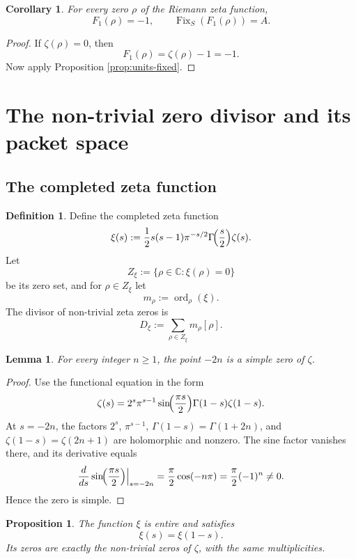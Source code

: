 \documentclass[11pt,a4paper]{article}
\newtheorem{proposition}[theorem]{Proposition}
\newtheorem{lemma}[theorem]{Lemma}
\newtheorem{corollary}[theorem]{Corollary}
\theoremstyle{definition}
\newtheorem{definition}[theorem]{Definition}
\theoremstyle{remark}
\DeclareMathOperator{\Fix}{Fix}
\DeclareMathOperator{\ord}{ord}
\newcommand{\CC}{\mathbb C}
\begin{document}
\begin{corollary}\label{cor:F1-zero}
For every zero $\rho$ of the Riemann zeta function,
\[
F_1(\rho)=-1,
\qquad
\Fix_S(F_1(\rho))=A.
\]
\end{corollary}

\begin{proof}
If $\zeta(\rho)=0$, then
\[
F_1(\rho)=\zeta(\rho)-1=-1.
\]
Now apply Proposition \ref{prop:units-fixed}.
\end{proof}

\section{The non-trivial zero divisor and its packet space}

\subsection{The completed zeta function}

\begin{definition}
Define the completed zeta function
\[
\xi(s):=\frac12 s(s-1)\pi^{-s/2}\Gamma\!\Bigl(\frac s2\Bigr)\zeta(s).
\]
Let
\[
Z_\xi:=\{\rho\in\CC:\xi(\rho)=0\}
\]
be its zero set, and for $\rho\in Z_\xi$ let
\[
m_\rho:=\ord_\rho(\xi).
\]
The divisor of non-trivial zeta zeros is
\[
D_\xi:=\sum_{\rho\in Z_\xi} m_\rho[\rho].
\]
\end{definition}

\begin{lemma}\label{lem:trivial-simple}
For every integer $n\ge 1$, the point $-2n$ is a simple zero of $\zeta$.
\end{lemma}

\begin{proof}
Use the functional equation in the form
\[
\zeta(s)=2^s\pi^{s-1}\sin\!\Bigl(\frac{\pi s}{2}\Bigr)\Gamma(1-s)\zeta(1-s).
\]
At $s=-2n$, the factors $2^s$, $\pi^{s-1}$, $\Gamma(1-s)=\Gamma(1+2n)$, and $\zeta(1-s)=\zeta(2n+1)$ are holomorphic and nonzero.  The sine factor vanishes there, and its derivative equals
\[
\frac{d}{ds}\sin\!\Bigl(\frac{\pi s}{2}\Bigr)\Big|_{s=-2n}
=\frac{\pi}{2}\cos(-n\pi)
=\frac{\pi}{2}(-1)^n\neq 0.
\]
Hence the zero is simple.
\end{proof}

\begin{proposition}\label{prop:xi-entire}
The function $\xi$ is entire and satisfies
\[
\xi(s)=\xi(1-s).
\]
Its zeros are exactly the non-trivial zeros of $\zeta$, with the same multiplicities.
\end{proposition}
\end{document}
